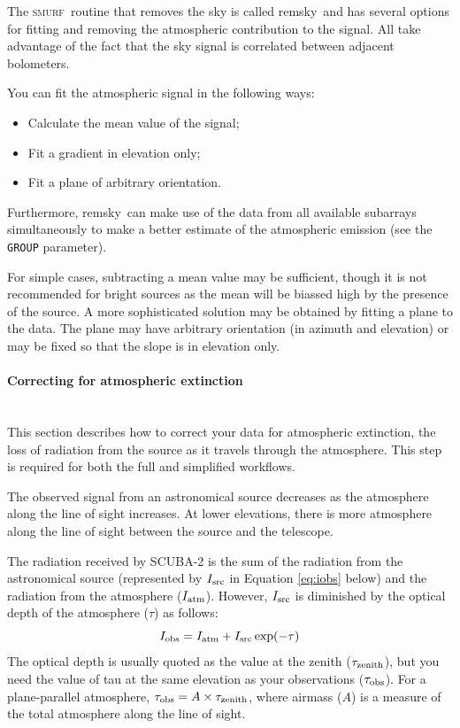 \documentclass[twoside,11pt]{article}
\newcommand{\xref}[3]{#1}
\newcommand{\xlabel}[1]{}
\renewcommand{\_}{\texttt{\symbol{95}}}
\newcommand{\SMURF}{\textsc{smurf}}
\newcommand{\task}[1]{\textsf{#1}}
\newcommand{\remsky}{\xref{\task{remsky}}{sun258}{REMSKY}}
\newcommand{\aparam}[1]{\texttt{#1}}     %
\begin{document}
The \SMURF\ routine that removes the sky is called \remsky\ and has
several options for fitting and removing the atmospheric contribution
to the signal. All take advantage of the fact that the sky signal is
correlated between adjacent bolometers.

You can fit the atmospheric signal in the following ways:
\begin{itemize}
\item Calculate the mean value of the signal;
\item Fit a gradient in elevation only;
\item Fit a plane of arbitrary orientation.
\end{itemize}
Furthermore, \remsky\ can make use of the data from all available
subarrays simultaneously to make a better estimate of the atmospheric
emission (see the \aparam{GROUP} parameter).

For simple cases, subtracting a mean value may be sufficient, though
it is not recommended for bright sources as the mean will be biassed
high by the presence of the source. A more sophisticated solution may
be obtained by fitting a plane to the data. The plane may have
arbitrary orientation (in azimuth and elevation) or may be fixed so
that the slope is in elevation only.

\paragraph{\xlabel{extinction}Correcting for atmospheric extinction\label{se:extinction}} \ \\

This section describes how to correct your data for atmospheric
extinction, the loss of radiation from the source as it travels
through the atmosphere. This step is required for both the full and
simplified workflows.

The observed signal from an astronomical source decreases as the
atmosphere along the line of sight increases. At lower elevations,
there is more atmosphere along the line of sight between the source
and the telescope.

The radiation received by SCUBA-2 is the sum of the radiation from the
astronomical source (represented by $I_{\rm src}$ in Equation
\ref{eq:iobs} below) and the radiation from the atmosphere ($I_{\rm
  atm}$). However, $I_{\rm src}$ is diminished by the optical depth
of the atmosphere ($\tau$) as follows:
\begin{equation}
I_{\rm obs} = I_{\rm atm} + I_{\rm src} \exp(-\tau)
\label{eq:iobs}
\end{equation}
The optical depth is usually quoted as the value at the zenith
($\tau_{\rm zenith}$), but you need the value of tau at the same
elevation as your observations ($\tau_{\rm obs}$). For a
plane-parallel atmosphere, $\tau_{\rm obs} = A \times \tau_{\rm
  zenith}$, where airmass ($A$) is a measure of the total atmosphere
along the line of sight.
\end{document}
